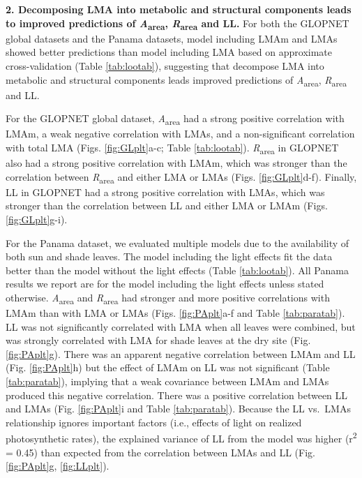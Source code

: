 \documentclass[
  12pt,
]{article}
\begin{document}
\textbf{2. Decomposing LMA into metabolic and structural components leads to improved predictions of \emph{A}\textsubscript{area}, \emph{R}\textsubscript{area} and LL.}
For both the GLOPNET global datasets and the Panama datasets, model including LMAm and LMAs showed better predictions than model including LMA based on approximate cross-validation (Table \ref{tab:lootab}), suggesting that decompose LMA into metabolic and structural components leads improved predictions of \emph{A}\textsubscript{area}, \emph{R}\textsubscript{area} and LL.

For the GLOPNET global dataset, \emph{A}\textsubscript{area} had a strong positive correlation with LMAm, a weak negative correlation with LMAs, and a non-significant correlation with total LMA (Figs. \ref{fig:GLplt}a-c; Table \ref{tab:lootab}).
\emph{R}\textsubscript{area} in GLOPNET also had a strong positive correlation with LMAm, which was stronger than the correlation between \emph{R}\textsubscript{area} and either LMA or LMAs (Figs. \ref{fig:GLplt}d-f).
Finally, LL in GLOPNET had a strong positive correlation with LMAs, which was stronger than the correlation between LL and either LMA or LMAm (Figs. \ref{fig:GLplt}g-i).

For the Panama dataset, we evaluated multiple models due to the availability of both sun and shade leaves.
The model including the light effects fit the data better than the model without the light effects (Table \ref{tab:lootab}).
All Panama results we report are for the model including the light effects unless stated otherwise.
\emph{A}\textsubscript{area} and \emph{R}\textsubscript{area} had stronger and more positive correlations with LMAm than with LMA or LMAs (Figs. \ref{fig:PAplt}a-f and Table \ref{tab:paratab}).
LL was not significantly correlated with LMA when all leaves were combined, but was strongly correlated with LMA for shade leaves at the dry site (Fig. \ref{fig:PAplt}g).
There was an apparent negative correlation between LMAm and LL (Fig. \ref{fig:PAplt}h) but the effect of LMAm on LL was not significant (Table \ref{tab:paratab}), implying that a weak covariance between LMAm and LMAs produced this negative correlation.
There was a positive correlation between LL and LMAs (Fig. \ref{fig:PAplt}i and Table \ref{tab:paratab}).
Because the LL vs.~LMAs relationship ignores important factors (i.e., effects of light on realized photosynthetic rates), the explained variance of LL from the model was higher (r\textsuperscript{2} = 0.45) than expected from the correlation between LMAs and LL (Fig. \ref{fig:PAplt}g, \ref{fig:LLplt}).
\end{document}
